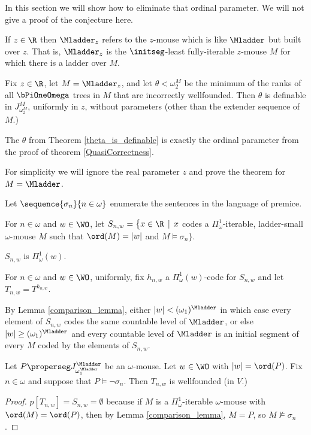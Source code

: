 \documentclass[oneside,12pt]{amsart}
\begin{document}
In this section we will show how to eliminate that ordinal parameter. We will not give a proof of the conjecture here.

\begin{definition}
If $z\in\R$ then $\Mladder_z$ refers to the $z$-mouse which is like $\Mladder$ but built over $z$.
That is, $\Mladder_z$ is the $\initseg$-least fully-iterable $z$-mouse $M$ for which there is
a ladder over $M$.
\end{definition}

\begin{theorem}
\label{theta_is_definable}
Fix $z\in\R$, let $M = \Mladder_z$, and let  $\theta<\omega_2^M$ be the
minimum of the ranks of all
$\bPiOneOmega$ trees in $M$ that are  incorrectly wellfounded.
Then $\theta$ is definable in $J^M_{\omega_2^M}$, uniformly in $z$,
without parameters (other than the extender sequence of $M$.)
\end{theorem}

The $\theta$ from Theorem \ref{theta_is_definable} is exactly the ordinal parameter
from the proof of theorem \ref{QuasiCorrectness}.

For simplicity we will ignore the real parameter $z$ and prove the theorem for $M=\Mladder$.


\begin{definition}
Let $\sequence{\sigma_n}{n\in\omega}$ enumerate the sentences in the language of premice.

For $n\in\omega$ and $w\in\WO$, let
$S_{n,w}=\big\{x\in \R \,\mid\, x$  codes a $\Pi^1_{\omega}$-iterable,
ladder-small $\omega$-mouse $M$ such that $\ord(M)=|w|$ and  $M\models\sigma_n\big\}$.

$S_{n,w}$ is $\Pi^1_{\omega}(w)$.

For $n\in\omega$ and $w\in\WO$, uniformly, fix $h_{n,w}$ a $\Pi^1_{\omega}(w)$-code for $S_{n,w}$
and let $T_{n,w}=T^{h_{n,w}}$.
\end{definition}

\begin{remark}
By Lemma \ref{comparison_lemma}, either $|w| < (\omega_1)^{\Mladder}$
in which case every element of $S_{n,w}$ codes the same countable level of $\Mladder$, or else
$|w| \geq (\omega_1)^{\Mladder}$ and every countable level of $\Mladder$ is an initial segment
of every $M$ coded by the elements of $S_{n,w}$.
\end{remark}

\begin{lemma}
\label{T_n_w_correctly_wellfounded}
Let $P\properseg J^{\Mladder}_{\omega_1^{\Mladder}}$ be an $\omega$-mouse. Let $w\in\WO$ with
$|w|=\ord(P)$. Fix $n\in\omega$
and suppose that $P\models \neg \sigma_n$. Then $T_{n,w}$ is wellfounded (in $V$.)
\end{lemma}
\begin{proof}
$p[T_{n,w}]=S_{n,w} = \emptyset$ because if $M$ is a $\Pi^1_{\omega}$-iterable $\omega$-mouse with
$\ord(M) = \ord(P)$, then by Lemma \ref{comparison_lemma}, $M=P$, so $M\not\models\sigma_n$.
\end{proof}
\end{document}
